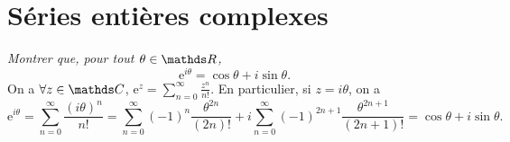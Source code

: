 \section{Séries entières complexes}

\begin{exo}
	\textsl{Montrer que, pour tout $\theta \in \R$, \[
		\mathrm{e}^{i \theta} = \cos \theta + i \sin \theta
	.\]}
	On a $\forall z \in \C$, $\mathrm{e}^{z} = \sum_{n=0}^\infty \frac{z^n}{n!}$.
	En particulier, si $z = i\theta$, on a \[
		\mathrm{e}^{i\theta} = \sum_{n=0}^\infty \frac{(i\theta)^n}{n!}
		= \sum_{n=0}^\infty (-1)^n \frac{\theta^{2n}}{(2n)!} + i \sum_{n=0}^\infty (-1)^{2n+1} \frac{\theta^{2n+1}}{(2n+1)!} = \cos \theta + i \sin \theta
	.\]
\end{exo}


